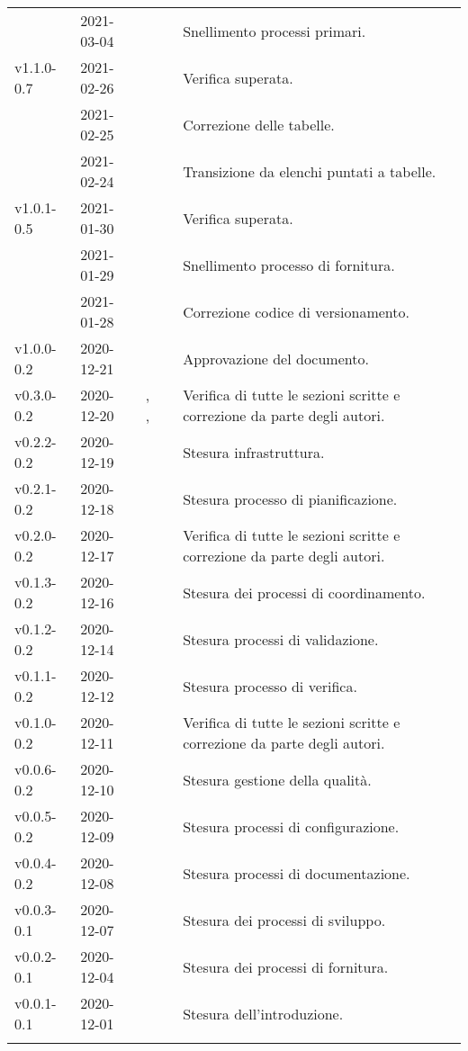 {\begin{longtable}{C{.131777\freewidth} C{.134036\freewidth} C{.263554\freewidth} C{.188254\freewidth} C{.282379\freewidth}}
		            & 2021-03-04 & \Tommaso{} & \ana{} & Snellimento processi primari. \\
		 v1.1.0-0.7 & 2021-02-26 & \Daniele{} & \ver{} & Verifica superata. \\
		 & 2021-02-25 & \Giosue{} & \ana{} & Correzione delle tabelle. \\
		  & 2021-02-24 & \Lucrezia{} & \ana{} & Transizione da elenchi puntati a tabelle. \\ 
		 v1.0.1-0.5 & 2021-01-30 & \Daniele{} & \ver{} &  Verifica superata. \\
		 & 2021-01-29 & \Lucrezia{} & \ana{} & Snellimento processo di fornitura. \\
		 & 2021-01-28 & \Lucrezia{} & \ana{} & Correzione codice di versionamento. \\
        v1.0.0-0.2 & 2020-12-21 & \Daniele{} & \RdP{} & Approvazione del documento. \\
        
        v0.3.0-0.2 & 2020-12-20 & \Giosue{}, \Matteo{}, \Tommaso{} & \vers{} & Verifica di tutte le sezioni scritte e correzione da parte degli autori. \\ 
        v0.2.2-0.2 & 2020-12-19 & \Lucrezia{} & \ana{} & Stesura infrastruttura. \\
        v0.2.1-0.2 & 2020-12-18 & \Davide{} & \ana{} & Stesura processo di pianificazione. \\ 
		
		v0.2.0-0.2 & 2020-12-17 & \Giosue{} & \ver{} & Verifica di tutte le sezioni scritte e correzione da parte degli autori. \\ 
		v0.1.3-0.2 & 2020-12-16 & \Lucrezia{} & \ana{} & Stesura dei processi di coordinamento. \\ 
		v0.1.2-0.2 & 2020-12-14 & \Davide{} & \ana{} & Stesura processi di validazione. \\ 
		v0.1.1-0.2 & 2020-12-12 & \Francesco{} & \ana{} & Stesura processo di verifica. \\ 		
		
		v0.1.0-0.2 & 2020-12-11 & \Matteo{} &  \ver{} & Verifica di tutte le sezioni scritte e correzione da parte degli autori. \\
		v0.0.6-0.2 & 2020-12-10 & \Davide{} &  \ana{} & Stesura gestione della qualità. \\
		v0.0.5-0.2 & 2020-12-09 & \Francesco{} &  \ana{} & Stesura processi di configurazione. \\
		v0.0.4-0.2 & 2020-12-08 & \Lucrezia{} &  \ana{} & Stesura processi di documentazione. \\
		
		
		v0.0.3-0.1 & 2020-12-07 & \Francesco{} &  \ana{} & Stesura dei processi di sviluppo. \\
		v0.0.2-0.1 & 2020-12-04 & \Davide{} &  \ana{} & Stesura dei processi di fornitura. \\
		v0.0.1-0.1 & 2020-12-01 & \Lucrezia{} &  \ana{} & Stesura dell'introduzione. \\


		\bottomrule
		\hiderowcolors
	\end{longtable}
}